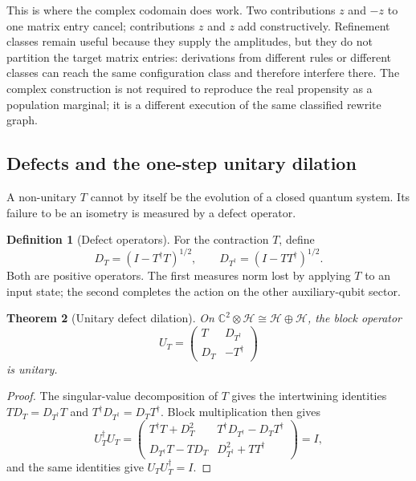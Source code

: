 \documentclass[11pt,a4paper]{article}
\theoremstyle{plain}
\newtheorem{theorem}{Theorem}
\theoremstyle{definition}
\newtheorem{definition}[theorem]{Definition}
\theoremstyle{remark}
\newcommand{\Cx}{\mathbb{C}}
\begin{document}
This is where the complex codomain does work. Two contributions $z$ and $-z$ to one matrix entry
cancel; contributions $z$ and $z$ add constructively. Refinement classes remain useful because they
supply the amplitudes, but they do not partition the target matrix entries: derivations from different
rules or different classes can reach the same configuration class and therefore interfere there. The
complex construction is not required to reproduce the real propensity as a population marginal; it
is a different execution of the same classified rewrite graph.

\subsection{Defects and the one-step unitary dilation}
\label{sec:dilation}

A non-unitary $T$ cannot by itself be the evolution of a closed quantum system. Its failure to be an
isometry is measured by a defect operator.

\begin{definition}[Defect operators]
\label{def:defect}
For the contraction $T$, define
\[
D_T=(I-T^\dagger T)^{1/2},
\qquad
D_{T^\dagger}=(I-TT^\dagger)^{1/2}.
\]
Both are positive operators. The first measures norm lost by applying $T$ to an input state; the
second completes the action on the other auxiliary-qubit sector.
\end{definition}

\begin{theorem}[Unitary defect dilation]
\label{thm:unitary-dilation}
On $\Cx^2\otimes\mathcal{H}\cong\mathcal{H}\oplus\mathcal{H}$, the block operator
\[
U_T
 =
\begin{pmatrix}
T & D_{T^\dagger} \\
D_T & -T^\dagger
\end{pmatrix}
\]
is unitary.
\end{theorem}

\begin{proof}
The singular-value decomposition of $T$ gives the intertwining identities
$TD_T=D_{T^\dagger}T$ and $T^\dagger D_{T^\dagger}=D_TT^\dagger$. Block multiplication then gives
\[
U_T^\dagger U_T
 =
\begin{pmatrix}
T^\dagger T+D_T^2 & T^\dagger D_{T^\dagger}-D_TT^\dagger \\
D_{T^\dagger}T-TD_T & D_{T^\dagger}^2+TT^\dagger
\end{pmatrix}
 = I,
\]
and the same identities give $U_TU_T^\dagger=I$.
\end{proof}
\end{document}
